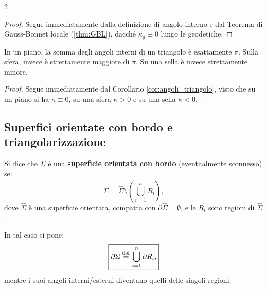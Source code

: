 \begin{multicols*}{2}
    \begin{proof}
        Segue immediatamente dalla definizione di angolo interno e dal Teorema di Gauss-Bonnet locale (\ref{thm:GBL}), dacché
        $\kappa_g \equiv 0$ lungo le geodetiche.
    \end{proof}

    \begin{corollary}
        In un piano, la somma degli angoli interni di un triangolo
        è esattamente $\pi$. Sulla sfera, invece è strettamente maggiore
        di $\pi$. Su una sella è invece strettamente minore.
    \end{corollary}

    \begin{proof}
        Segue immediatamente dal Corollario \ref{cor:angoli_triangolo}, visto
        che su un piano si ha $\kappa \equiv 0$, su una sfera $\kappa > 0$ e
        su una sella $\kappa < 0$.
    \end{proof}

    \subsection{Superfici orientate con bordo e triangolarizzazione}

    \begin{definition}
        Si dice che $\Sigma$ è una \textbf{superficie orientata con bordo} (eventualmente
        sconnesso) se:
        \[
            \Sigma = \overline{\hat{\Sigma} \setminus \left( \bigcup_{i=1}^n R_i \right)},
        \]
        dove $\hat{\Sigma}$ è una superficie orientata, compatta con $\partial \hat{\Sigma} = \emptyset$,
        e le $R_i$ sono regioni di $\hat{\Sigma}$. \smallskip

        In tal caso si pone:
        \[
            \boxed{\partial \Sigma \overset{\mathrm{def}}{=} \bigcup_{i=1}^n \partial R_i,}
        \]
        mentre i suoi angoli interni/esterni diventano quelli delle singoli regioni.
    \end{definition}


\end{multicols*}
